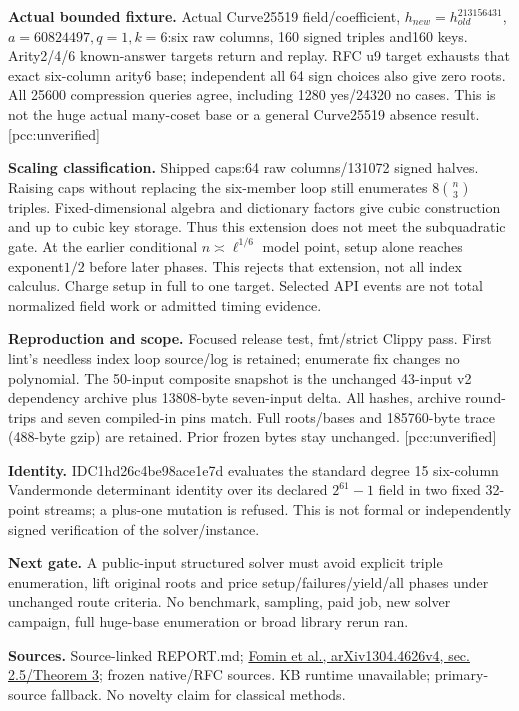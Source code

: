 \documentclass[10pt]{article}
\begin{document}
\textbf{Actual bounded fixture.} Actual Curve25519 field/coefficient,
$h_{new}=h_{old}^{213156431}$, $a=60824497,q=1,k=6$:six raw columns,
160 signed triples and160 keys. Arity2/4/6 known-answer targets return
and replay. RFC u9 target exhausts that exact six-column arity6 base;
independent all 64 sign choices also give zero roots. All 25600 compression
queries agree, including 1280 yes/24320 no cases. This is not the huge
actual many-coset base or a general Curve25519 absence result.
[pcc:unverified]

\textbf{Scaling classification.} Shipped caps:64 raw columns/131072
signed halves. Raising caps without replacing the six-member loop still
enumerates $8\binom n3$ triples. Fixed-dimensional algebra and dictionary
factors give cubic construction and up to cubic key storage. Thus this
extension does not meet the subquadratic gate. At the earlier conditional
$n\asymp\ell^{1/6}$ model point, setup alone reaches exponent$1/2$ before
later phases. This rejects that extension, not all index calculus. Charge
setup in full to one target. Selected API events are not total normalized
field work or admitted timing evidence.

\textbf{Reproduction and scope.} Focused release test, fmt/strict Clippy
pass. First lint's needless index loop source/log is retained; enumerate
fix changes no polynomial. The 50-input composite snapshot is the unchanged
43-input v2 dependency archive plus 13808-byte seven-input delta. All hashes,
archive round-trips and seven compiled-in pins match. Full roots/bases and
185760-byte trace (488-byte gzip) are retained. Prior frozen bytes stay
unchanged. [pcc:unverified]

\textbf{Identity.} IDC1hd26c4be98ace1e7d evaluates the standard degree 15
six-column Vandermonde determinant identity over its declared $2^{61}-1$
field in two fixed 32-point streams; a plus-one mutation is refused. This
is not formal or independently signed verification of the solver/instance.

\textbf{Next gate.} A public-input structured solver must avoid explicit
triple enumeration, lift original roots and price setup/failures/yield/all
phases under unchanged route criteria. No benchmark, sampling, paid job,
new solver campaign, full huge-base enumeration or broad library rerun ran.

\textbf{Sources.} Source-linked REPORT.md;
\href{https://arxiv.org/abs/1304.4626}{Fomin et al., arXiv1304.4626v4, sec. 2.5/Theorem 3}; frozen native/RFC sources. KB runtime
unavailable; primary-source fallback. No novelty claim for classical methods.
\end{document}
